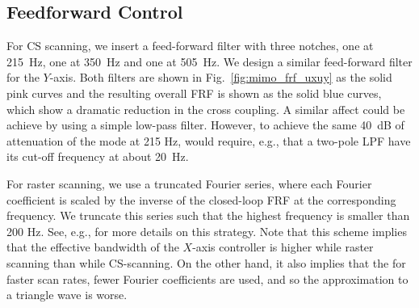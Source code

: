 \documentclass[twocolumn,oneside]{IEEEtran/IEEEtran}
\begin{document}

\subsection{Feedforward Control}\label{sec:ff_control}

For CS scanning, we insert a feed-forward filter with three notches, one at 215~Hz, one at 350~Hz and one at 505~Hz. We design a similar feed-forward filter for the $Y$-axis. Both filters are shown in Fig.~\ref{fig:mimo_frf_uxuy} as the solid pink curves and the resulting overall FRF is shown as the solid blue curves, which show a dramatic reduction in the cross coupling. A similar affect could be achieve by using a simple low-pass filter. However, to achieve the same 40~dB of attenuation of the mode at 215 Hz, would require, e.g., that a two-pole LPF have its cut-off frequency at about 20~Hz. 

For raster scanning, we use a truncated Fourier series, where each Fourier coefficient is scaled by the inverse of the closed-loop FRF at the corresponding frequency. We truncate this series such that the highest frequency is smaller than 200 Hz. See, e.g., \cite{clayton_review_2009} for more details on this strategy. Note that this scheme implies that the effective bandwidth of the $X$-axis controller is higher while raster scanning than while CS-scanning. On the other hand, it also implies that the for faster scan rates, fewer Fourier coefficients are used, and so the approximation to a triangle wave is worse.

\end{document}

